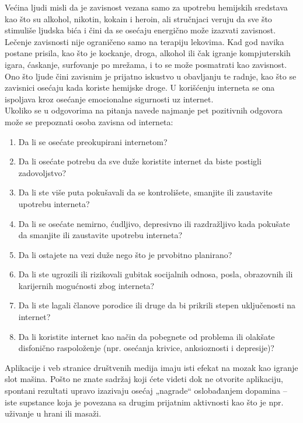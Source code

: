 \documentclass[a4paper]{article}
\begin{document}
{		Većina ljudi misli da je zavisnost vezana samo za upotrebu hemijskih sredstava kao što su alkohol, nikotin, kokain i heroin, ali stručnjaci veruju da sve što stimuliše ljudska bića i čini da se osećaju energično može izazvati zavisnost. Lečenje zavisnosti nije ograničeno samo na terapiju lekovima. Kad god navika postane prisila, kao što je kockanje, droga, alkohol ili čak igranje kompjuterskih igara, ćaskanje, surfovanje po mrežama, i to se može posmatrati kao zavisnost. Ono što ljude čini zavisnim je prijatno iskustvo u obavljanju te radnje, kao što se zavisnici osećaju kada koriste hemijske droge. U korišćenju interneta se ona ispoljava kroz osećanje emocionalne sigurnosti uz internet.\\
		Ukoliko se u odgovorima na pitanja navede najmanje pet pozitivnih odgovora može se prepoznati osoba zavisna od interneta:
		\begin{enumerate}
			\item
			Da li se osećate preokupirani internetom?
			\item
			Da li osećate potrebu da sve duže koristite internet da biste postigli zadovoljstvo?
			\item
			Da li ste više puta pokušavali da se kontrolišete, smanjite ili zaustavite upotrebu interneta?
			\item
			Da li se osećate nemirno, ćudljivo, depresivno ili razdražljivo kada pokušate da smanjite ili zaustavite upotrebu interneta?
			\item
			Da li ostajete na vezi duže nego što je prvobitno planirano?
			\item
			Da li ste ugrozili ili rizikovali gubitak socijalnih odnosa, posla, obrazovnih ili karijernih mogućnosti zbog interneta?
			\item
			Da li ste lagali članove porodice ili druge da bi prikrili stepen uključenosti na internet?
			\item Da li koristite internet kao način da pobegnete od problema ili olakšate disfonično raspoloženje (npr. osećanja krivice, anksioznosti i depresije)?
		\end{enumerate}
		Aplikacije i veb stranice društvenih medija imaju isti efekat na mozak kao igranje slot mašina. Pošto ne znate sadržaj koji ćete videti dok ne otvorite aplikaciju, spontani rezultati upravo izazivaju osećaj „nagrade“ oslobađanjem dopamina – iste supstance koja je povezana sa drugim prijatnim aktivnosti kao što je npr. uživanje u hrani ili masaži.\\\\
}
\end{document}
